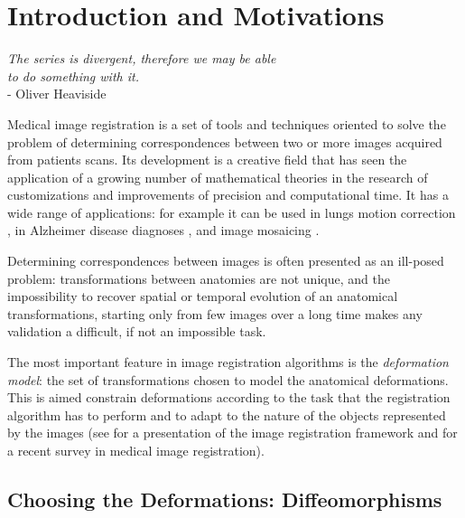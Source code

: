 \chapter{Introduction and Motivations}\label{ch:introduction}


\begin{flushright}
		\emph{The series is divergent, therefore we may be able \\ to do something with it.}\\
			- Oliver Heaviside
\end{flushright}

\vspace{0.6cm}


Medical image registration is a set of tools and techniques oriented to solve the problem of determining correspondences between two or more images acquired from patients scans. Its development is a creative field that has seen the application of a growing number of mathematical theories in the research of customizations and improvements of precision and computational time. It has a wide range of applications: for example it can be used in lungs motion correction \cite{mcclelland,mcclelland2011inter}, in Alzheimer disease diagnoses \cite{prados2015measuring, fox1997brain, gauthier2012prevention}, and image mosaicing \cite{vercauteren2006robust, szeliski1994image}.  

Determining correspondences between images is often presented as an ill-posed problem: transformations between anatomies are not unique, and the impossibility to recover spatial or temporal evolution of an anatomical transformations, starting only from few images over a long time makes any validation a difficult, if not an impossible task. 

The most important feature in image registration algorithms is the \emph{deformation model}: the set of transformations chosen to model the anatomical deformations. This is aimed constrain deformations according to the task that the registration algorithm has to perform and to adapt to the nature of the objects represented by the images (see \cite{ibanez2003itk} for a presentation of the image registration framework and \cite{Sotiras:survey:13} for a recent survey in medical image registration). 

\section{Choosing the Deformations: Diffeomorphisms}

